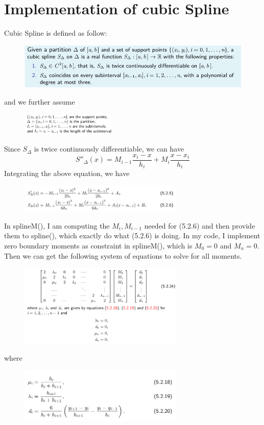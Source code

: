 \documentclass[12pt,a4paper]{article}
\begin{document}
\section{Implementation of cubic Spline}
Cubic Spline is defined as follow:
\begin{figure}[H]
  \centering
      \includegraphics[width=1\textwidth]{./spline.png}
\end{figure}
and we further assume
\begin{figure}[H]
  \centering
      \includegraphics[width=0.4\textwidth]{./assume.png}
\end{figure}
Since $S_\Delta$ is twice continuously differentiable, we can have $$S''_{\Delta}(x) = M_{i-1}\frac{x_i - x}{h_i} + M_i \frac{x-x_i}{h_i}$$
Integrating the above equation, we have
\begin{figure}[H]
  \centering
      \includegraphics[width=0.7\textwidth]{./differen.png}
\end{figure}
In splineM(), I am computing the $M_i, M_{i-1}$ needed for (5.2.6) and then provide them to spline(), which exactly do what (5.2.6) is doing. 
In my code, I implement zero boundary moments as constraint in splineM(), which is $M_0 = 0$ and $M_n = 0$. Then we can get the following system of equations to solve for all moments.
\begin{figure}[H]
  \centering
      \includegraphics[width=0.7\textwidth]{./sys.png}
\end{figure}
where 
\begin{figure}[H]
  \centering
      \includegraphics[width=0.7\textwidth]{./var.png}
\end{figure}
\end{document}
